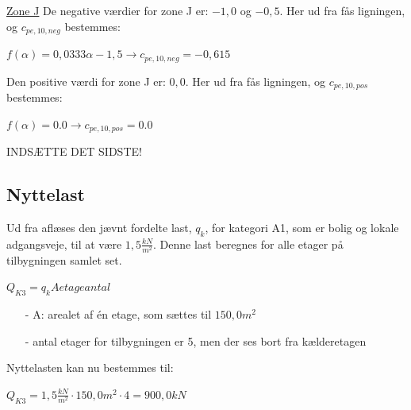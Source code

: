 \underline{Zone J}
\newline
De negative værdier for zone J er: $-1,\!0$ og $-0,\!5$. Her ud fra fås ligningen, og $c_{pe,10,neg}$ bestemmes:
\begin{center}
	$f(\alpha)=0,\!0333\alpha - 1,\!5 \to c_{pe,10,neg}=-0,\!615$
\end{center}
Den positive værdi for zone J er: $0,\!0$. Her ud fra fås ligningen, og $c_{pe,10,pos}$ bestemmes:
\begin{center}
	$f(\alpha)=0.0 \to c_{pe,10,pos}=0.0$
\end{center}
INDSÆTTE DET SIDSTE!

\subsection{Nyttelast}
Ud fra \citep[ tabel 6.2 kapitel 6.3.1.2]{EU91} aflæses den jævnt fordelte last, $q_k$, for kategori A1, som er bolig og lokale adgangsveje, til at være $1,\!5 \frac{kN}{m^2}$. Denne last beregnes for alle etager på tilbygningen samlet set.
\begin{center}
	$Q_{K3}=q_k A etageantal$
\end{center}
\begin{itemize}
	\item[-] A: arealet af én etage, som sættes til $150,\!0 m^2$
	\item[-] antal etager for tilbygningen er 5, men der ses bort fra kælderetagen
\end{itemize}
Nyttelasten kan nu bestemmes til:
\begin{center}
	$Q_{K3}=1,\!5 \frac{kN}{m^2}\cdot 150,\!0 m^2\cdot 4=900,\!0 kN$
\end{center}


